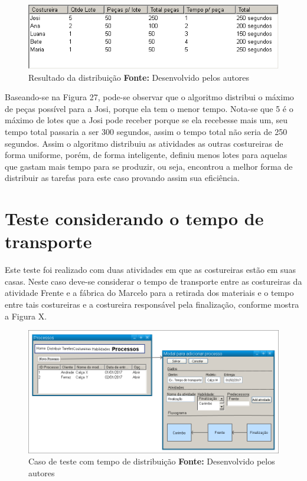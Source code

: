 \begin{figure}[h!]
	\centerline{\includegraphics[scale=0.6]{./imagens/test_case1_resultado.png}}
	\caption[Caso de teste Habilidade]
	{Resultado da distribuição \textbf{Fonte:} Desenvolvido pelos autores}
	\label{fig:exemplo1}
\end{figure}

\par Baseando-se na Figura 27, pode-se observar que o algoritmo distribui o máximo de peças possível para a Josi, porque
ela tem o menor tempo. Nota-se que 5 é o máximo de lotes que a Josi pode receber porque se ela recebesse mais um, seu 
tempo total passaria a ser 300 segundos, assim o tempo total não seria de 250 segundos. Assim o algoritmo distribuiu as 
atividades as outras costureiras de forma uniforme, porém, de forma inteligente, definiu menos lotes para aquelas que 
gastam mais tempo para se produzir, ou seja, encontrou a melhor forma de distribuir as tarefas para este caso provando assim
sua eficiência.

\section{Teste considerando o tempo de transporte}
\par Este teste foi realizado com duas atividades em que as costureiras estão em suas casas. Neste caso deve-se considerar
o tempo de transporte entre as costureiras da atividade Frente e a fábrica do Marcelo para a retirada dos materiais e o tempo 
entre tais costureiras e a costureira responsável pela finalização, conforme mostra a Figura X.


\begin{figure}[h!]
	\centerline{\includegraphics[scale=0.3]{./imagens/test_case_2.png}}
	\caption[Caso de teste tempo]
	{Caso de teste com tempo de distribuição \textbf{Fonte:} Desenvolvido pelos autores}
	\label{fig:exemplo1}
\end{figure}


